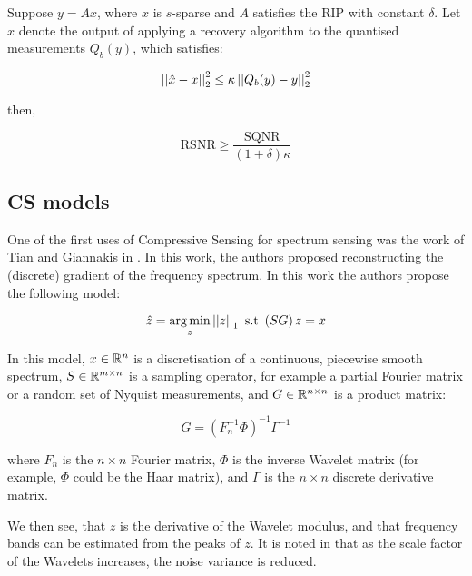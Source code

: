 \begin{theorem}
Suppose \(y=Ax\), where \(x\) is \(s\)-sparse and \(A\) satisfies the RIP with constant \(\delta\). Let \(\hat{x}\) denote the output of applying a recovery algorithm to the quantised measurements \(Q_b(y)\), which satisfies:

\begin{equation}
\left|\left|\hat{x}-x\right|\right|_2^2 \leq \kappa \left|\left|Q_b(y) - y\right|\right|_2^2
\end{equation}

then,

\begin{equation}
\mathrm{RSNR} \geq \frac{\mathrm{SQNR}}{(1+\delta)\kappa}
\end{equation}
\end{theorem}



\subsection{CS models}
One of the first uses of Compressive Sensing for spectrum sensing was the work of Tian and Giannakis in \cite{Tian2007}. In this work, the authors proposed reconstructing the (discrete) gradient of the frequency spectrum. In this work the authors propose the following model:

\begin{equation}
\hat{z} = \operatorname*{arg\,min}_z \left|\left|z\right|\right|_1 \text{ s.t } \left(SG\right)z = x 
\end{equation}

In this model, \(x \in {\mathbb{R}}^n\) is a discretisation of a continuous, piecewise smooth spectrum, \(S \in {\mathbb{R}}^{m \times n}\) is a sampling operator, for example a partial Fourier matrix or a random set of Nyquist measurements, and \(G \in {\mathbb{R}}^{n \times n}\) is a product matrix:

\begin{equation}
G = \left(F_n^{-1} \Phi \right)^{-1}\Gamma^{-1}
\end{equation}

where \(F_n\) is the \(n \times n\) Fourier matrix, \(\Phi\) is the inverse Wavelet matrix (for example, \(\Phi\) could be the Haar matrix), and \(\Gamma\) is the \(n \times n\) discrete derivative matrix.

We then see, that \(z\) is the derivative of the Wavelet modulus, and that frequency bands can be estimated from the peaks of \(z\). It is noted in \cite{Tian2007} that as the scale factor of the Wavelets increases, the noise variance is reduced. 

